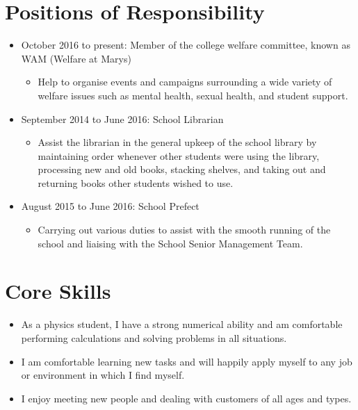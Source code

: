 \documentclass[10pt, a4paper]{article}
\begin{document}
\section{Positions of Responsibility}
\begin{itemize}
	\item October 2016 to present: Member of the college welfare committee, known as WAM (Welfare at Mary\textquotesingle s)
	\begin{itemize}
		\item Help to organise events and campaigns surrounding a wide variety of welfare issues such as mental health, sexual health, and student support.
	\end{itemize}
	\item September 2014 to June 2016: School Librarian
	\begin{itemize}
		\item Assist the librarian in the general upkeep of the school library by maintaining order whenever other students were using the library, processing new and old books, stacking shelves, and taking out and returning books other students wished to use.
	\end{itemize}
	\item August 2015 to June 2016: School Prefect
	\begin{itemize}
		\item Carrying out various duties to assist with the smooth running of the school and liaising with the School Senior Management Team.
	\end{itemize}
\end{itemize}
\section{Core Skills}
\begin{itemize}
	\item As a physics student, I have a strong numerical ability and am comfortable performing calculations and solving problems in all situations.
	\item I am comfortable learning new tasks and will happily apply myself to any job or environment in which I find myself.
	\item I enjoy meeting new people and dealing with customers of all ages and types.
\end{itemize}
\end{document}
